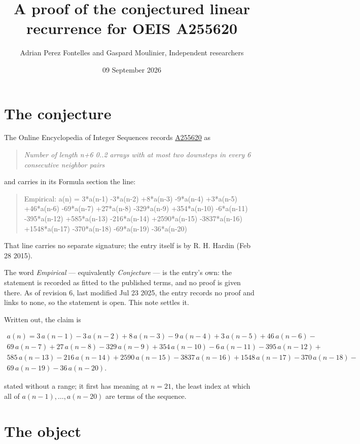 \documentclass[11pt]{article}
\title{A proof of the conjectured linear recurrence for OEIS A255620}
\author{Adrian Perez Fontelles and Gaspard Moulinier, Independent researchers}
\date{09 September 2026}
\theoremstyle{definition}
\begin{document}
\maketitle
\section{The conjecture}

The Online Encyclopedia of Integer Sequences records \href{https://oeis.org/A255620}{A255620} as

\begin{quote}\itshape Number of length n+6 0..2 arrays with at most two downsteps in every 6 consecutive neighbor pairs\end{quote}

and carries in its Formula section the line:

\begin{quote}\ttfamily Empirical: a(n) = 3*a(n-1) -3*a(n-2) +8*a(n-3) -9*a(n-4) +3*a(n-5) +46*a(n-6) -69*a(n-7) +27*a(n-8) -329*a(n-9) +354*a(n-10) -6*a(n-11) -395*a(n-12) +585*a(n-13) -216*a(n-14) +2590*a(n-15) -3837*a(n-16) +1548*a(n-17) -370*a(n-18) -69*a(n-19) -36*a(n-20)\end{quote}

That line carries no separate signature; the entry itself is by R. H. Hardin (Feb 28 2015).

The word {\itshape Empirical} --- equivalently {\itshape Conjecture} --- is the entry's own: the statement is recorded as fitted to the published terms, and no proof is given there. As of revision 6, last modified Jul 23 2025, the entry records no proof and links to none, so the statement is open. This note settles it.

Written out, the claim is

\begin{multline*} a(n) = 3\,a(n-1) - 3\,a(n-2) + 8\,a(n-3) - 9\,a(n-4) + 3\,a(n-5) + 46\,a(n-6) - \\ 69\,a(n-7) + 27\,a(n-8) - 329\,a(n-9) + 354\,a(n-10) - 6\,a(n-11) - 395\,a(n-12) + \\ 585\,a(n-13) - 216\,a(n-14) + 2590\,a(n-15) - 3837\,a(n-16) + 1548\,a(n-17) - 370\,a(n-18) - \\ 69\,a(n-19) - 36\,a(n-20). \end{multline*}

stated without a range; it first has meaning at $n = 21$, the least index at which all of $a(n-1),\dots,a(n-20)$ are terms of the sequence.

\section{The object}
\end{document}
